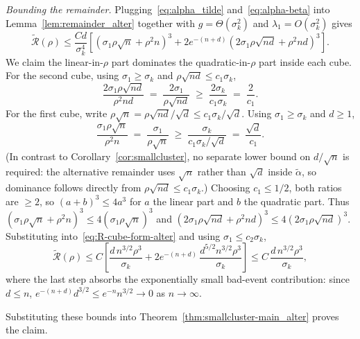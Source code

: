 \documentclass[10pt,a4paper]{amsart}
\newcommand{\Rcal}{\mathcal{R}}
\newenvironment{proof}{\par\noindent{\bf Proof\ }}{\hfill\BlackBox\par\medskip}
\newcommand{\rbr}[1]{\left(#1\right)}
\newcommand{\sbr}[1]{\left[#1\right]}
\begin{document}
\begin{proof}
\emph{Bounding the remainder.} Plugging~\eqref{eq:alpha_tilde} and~\eqref{eq:alpha-beta} into Lemma~\ref{lem:remainder_alter} together with $g = \Theta(\sigma_k^2)$ and $\lambda_1 = O(\sigma_k^2)$ gives
\begin{equation}\label{eq:R-cube-form-alter}
    \tilde{\Rcal}(\rho) \le \frac{Cd}{\sigma_k^4}\sbr{\rbr{\sigma_1\rho\sqrt n + \rho^2 n}^3 + 2 e^{-(n+d)}\rbr{2\sigma_1\rho\sqrt{nd}+\rho^2 nd}^3}.
\end{equation}
We claim the linear-in-$\rho$ part dominates the quadratic-in-$\rho$ part inside each cube. For the second cube, using $\sigma_1 \ge \sigma_k$ and $\rho\sqrt{nd} \le c_1\sigma_k$,
\begin{equation*}
    \frac{2\sigma_1\rho\sqrt{nd}}{\rho^2 nd} \;=\; \frac{2\sigma_1}{\rho\sqrt{nd}} \;\ge\; \frac{2\sigma_k}{c_1\sigma_k} \;=\; \frac{2}{c_1}.
\end{equation*}
For the first cube, write $\rho\sqrt n = \rho\sqrt{nd}/\sqrt d \le c_1\sigma_k/\sqrt d$. Using $\sigma_1 \ge \sigma_k$ and $d \ge 1$,
\begin{equation*}
    \frac{\sigma_1\rho\sqrt n}{\rho^2 n} \;=\; \frac{\sigma_1}{\rho\sqrt n} \;\ge\; \frac{\sigma_k}{c_1\sigma_k/\sqrt d} \;=\; \frac{\sqrt d}{c_1}.
\end{equation*}
(In contrast to Corollary~\ref{cor:smallcluster}, no separate lower bound on $d/\sqrt n$ is required: the alternative remainder uses $\sqrt n$ rather than $\sqrt d$ inside $\tilde\alpha$, so dominance follows directly from $\rho\sqrt{nd}\le c_1\sigma_k$.) Choosing $c_1 \le 1/2$, both ratios are $\ge 2$, so $(a+b)^3 \le 4 a^3$ for $a$ the linear part and $b$ the quadratic part. Thus $(\sigma_1\rho\sqrt n + \rho^2 n)^3 \le 4(\sigma_1\rho\sqrt n)^3$ and $(2\sigma_1\rho\sqrt{nd} + \rho^2 nd)^3 \le 4(2\sigma_1\rho\sqrt{nd})^3$. Substituting into~\eqref{eq:R-cube-form-alter} and using $\sigma_1 \le c_2\sigma_k$,
\begin{equation*}
    \tilde{\Rcal}(\rho) \le C\sbr{\frac{d\, n^{3/2}\rho^3}{\sigma_k} + 2 e^{-(n+d)}\,\frac{d^{5/2} n^{3/2}\rho^3}{\sigma_k}} \le C\,\frac{d\, n^{3/2}\rho^3}{\sigma_k},
\end{equation*}
where the last step absorbs the exponentially small bad-event contribution: since $d \le n$, $e^{-(n+d)} d^{3/2} \le e^{-n} n^{3/2} \to 0$ as $n \to \infty$.

Substituting these bounds into Theorem~\ref{thm:smallcluster-main_alter} proves the claim.
\end{proof}
\end{document}
